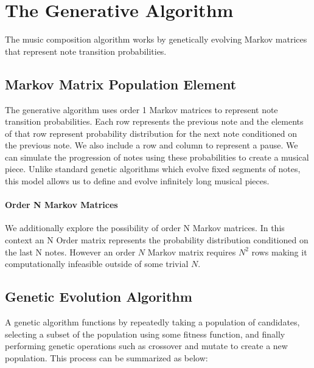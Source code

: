 \documentclass{article}
\begin{document}
\section{The Generative Algorithm}

The music composition algorithm works by genetically evolving Markov matrices that represent note transition probabilities.

\subsection{Markov Matrix Population Element}

The generative algorithm uses order 1 Markov matrices to represent note transition probabilities. Each row represents the previous note and the elements of that row represent probability distribution for the next note conditioned on the previous note. We also include a row and column to represent a pause. We can simulate the progression of notes using these probabilities to create a musical piece. Unlike standard genetic algorithms which evolve fixed segments of notes, this model allows us to define and evolve infinitely long musical pieces.

\paragraph{Order N Markov Matrices} We additionally explore the possibility of order N Markov matrices. In this context an N Order matrix represents the probability distribution conditioned on the last N notes. However an order $N$ Markov matrix requires $N^2$ rows making it computationally infeasible outside of some trivial $N$.

\subsection{Genetic Evolution Algorithm}

A genetic algorithm functions by repeatedly taking a population of candidates, selecting a subset of the population using some fitness function, and finally performing genetic operations such as crossover and mutate to create a new population. This process can be summarized as below:
\end{document}
